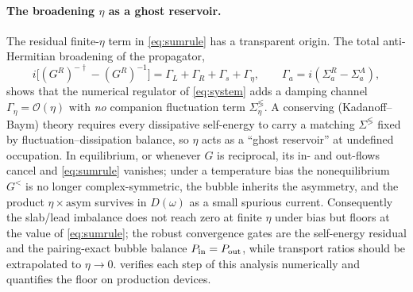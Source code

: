\paragraph{The broadening $\eta$ as a ghost reservoir.}
The residual finite-$\eta$ term in \cref{eq:sumrule} has a transparent origin.
The total anti-Hermitian broadening of the propagator,
\begin{equation}\label{eq:ghost}
  i\bigl[(G^R)^{-\dagger}-(G^R)^{-1}\bigr]
   = \Gamma_L + \Gamma_R + \Gamma_s + \Gamma_\eta,
   \qquad \Gamma_a = i(\Sigma_a^R-\Sigma_a^A),
\end{equation}
shows that the numerical regulator of \cref{eq:system} adds a damping channel
$\Gamma_\eta=\mathcal{O}(\eta)$ with \emph{no} companion fluctuation term
$\Sigma_\eta^{\lessgtr}$. A conserving (Kadanoff--Baym) theory requires every
dissipative self-energy to carry a matching $\Sigma^{\lessgtr}$ fixed by
fluctuation--dissipation balance, so $\eta$ acts as a ``ghost reservoir'' at
undefined occupation. In equilibrium, or whenever $G$ is reciprocal, its in-
and out-flows cancel and \cref{eq:sumrule} vanishes; under a temperature bias
the nonequilibrium $G^<$ is no longer complex-symmetric, the bubble inherits
the asymmetry, and the product $\eta\times\mathrm{asym}$ survives in $D(\omega)$
as a small spurious current. Consequently the slab/lead imbalance does not
reach zero at finite $\eta$ under bias but floors at the value of
\cref{eq:sumrule}; the robust convergence gates are the self-energy residual
and the pairing-exact bubble balance $P_{\rm in}=P_{\rm out}$, while transport
ratios should be extrapolated to $\eta\to0$.  verifies
each step of this analysis numerically and quantifies the floor on production
devices.

